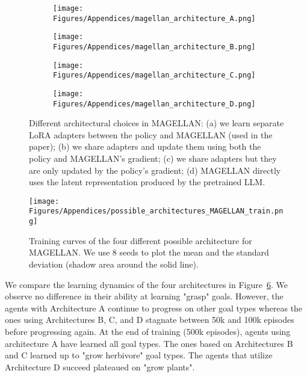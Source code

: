 \begin{figure}
\centering
\begin{subfigure}{.49\textwidth}
    \centering
    \texttt{[image: Figures/Appendices/magellan\_architecture\_A.png]}  
    \caption{}
    \label{fig:MAGELLAN_architecture_A}
\end{subfigure}
\begin{subfigure}{.49\textwidth}
    \centering
    \texttt{[image: Figures/Appendices/magellan\_architecture\_B.png]}  
    \caption{}
    \label{fig:MAGELLAN_architecture_B}
\end{subfigure}
\begin{subfigure}{.49\textwidth}
    \centering
    \texttt{[image: Figures/Appendices/magellan\_architecture\_C.png]}  
    \caption{}
    \label{fig:MAGELLAN_architecture_C}
\end{subfigure}
\begin{subfigure}{.49\textwidth}
    \centering
    \texttt{[image: Figures/Appendices/magellan\_architecture\_D.png]}  
    \caption{}
    \label{fig:MAGELLAN_architecture_D}
\end{subfigure}
\caption{Different architectural choices in MAGELLAN: (a) we learn separate LoRA adapters between the policy and MAGELLAN (used in the paper); (b) we share adapters and update them using both the policy and MAGELLAN's gradient; (c) we share adapters but they are only updated by the policy's gradient; (d) MAGELLAN directly uses the latent representation produced by the pretrained LLM.}
\label{fig:possible_architectures_MAGELLAN}
\end{figure}

\begin{figure}
    \centering
    \texttt{[image: Figures/Appendices/possible\_architectures\_MAGELLAN\_train.png]}
    \caption{Training curves of the four different possible architecture for MAGELLAN. We use $8$ seeds to plot the mean and the standard deviation (shadow area around the solid line).}
    \label{fig:possible_architectures_MAGELLAN_train}
\end{figure}

We compare the learning dynamics of the four architectures in Figure~\ref{fig:possible_architectures_MAGELLAN_train}. We observe no difference in their ability at learning "grasp" goals. However, the agents with Architecture A continue to progress on other goal types whereas the ones using Architectures B, C, and D stagnate between 50k and 100k episodes before progressing again. At the end of training (500k episodes), agents using architecture A have learned all goal types. The ones based on Architectures B and C learned up to "grow herbivore" goal types. The agents that utilize Architecture D succeed plateaued on "grow plants". 

